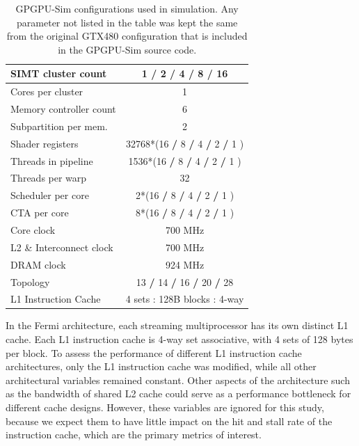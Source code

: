 \begin{table}[ht]
\caption{GTX580 Configuration in GPGPU-Sim}
\begin{tabular}{l|c}
\hline\hline
SIMT cluster count & 1 \textbf{/} 2 \textbf{/} 4 \textbf{/} 8 \textbf{/} 16  \\
\hline
Cores per cluster & 1 \\
\hline
Memory controller count & 6 \\
\hline
Subpartition per mem. & 2 \\ 
\hline
Shader registers & 32768*(16 \textbf{/} 8 \textbf{/} 4 \textbf{/} 2 \textbf{/} 1 ) \\
\hline
Threads in pipeline & 1536*(16 \textbf{/} 8 \textbf{/} 4 \textbf{/} 2 \textbf{/} 1 ) \\
\hline
Threads per warp & 32 \\
\hline
Scheduler per core & 2*(16 \textbf{/} 8 \textbf{/} 4 \textbf{/} 2 \textbf{/} 1 )\\
\hline
CTA per core & 8*(16 \textbf{/} 8 \textbf{/} 4 \textbf{/} 2 \textbf{/} 1 )\\
\hline
Core clock & 700 MHz\\
\hline
L2 \& Interconnect clock & 700 MHz\\
\hline
DRAM clock & 924 MHz\\
\hline
Topology & 13 \textbf{/} 14 \textbf{/} 16 \textbf{/} 20 \textbf{/} 28 \\
\hline
L1 Instruction Cache & 4 sets : 128B blocks : 4-way \\
\bottomrule[1pt]
\end{tabular}
\caption*{\textmd{GPGPU-Sim configurations used in simulation. Any parameter not listed in the table was kept the same from the original GTX480 configuration that is included in the GPGPU-Sim source code.}}
\label{table:gpuconfig}
\end{table}

In the Fermi architecture, each streaming multiprocessor has
its own distinct L1 cache. 
Each L1 instruction cache is 4-way set associative, with 4 sets of
128 bytes per block. 
To assess the  performance of different L1 instruction cache
architectures, only the L1 instruction cache was modified, while all
other architectural variables remained constant. 
Other aspects of the architecture such as the bandwidth of shared L2
cache could serve as a performance bottleneck for different cache
designs. 
However, these variables are ignored for this study, because we expect
them to have little impact on the hit and stall rate of the
instruction cache, which are the primary metrics of interest.

